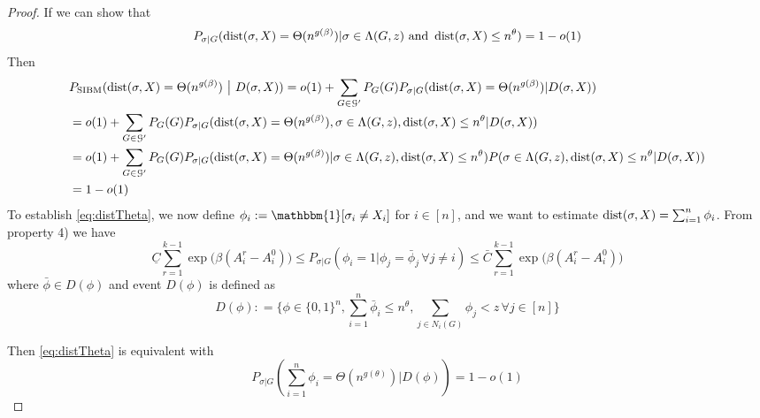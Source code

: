 \documentclass{article}
\begin{document}
\begin{proof}
	If we can show that
	\begin{equation}\label{eq:distTheta}
	P_{\sigma | G}(\operatorname{dist}(\sigma, X) = \Theta(n^{g(\beta)})
	| \sigma \in  \Lambda(G, z)
	\text{~and~} \operatorname{dist}(\sigma, X) \le n^\theta) = 1 - o(1)
	\end{equation}
	Then
	\begin{align*}
	&P_{\operatorname{SIBM}}(\operatorname{dist}(\sigma, X) = \Theta(n^{g(\beta)}) ~\big|~ D(\sigma, X) )  = o(1)
	+ \sum_{G \in \mathcal{G}'} P_G(G) P_{\sigma | G}(\operatorname{dist}(\sigma, X) = \Theta(n^{g(\beta)}) | D(\sigma, X)) \\
	& =o(1)
	+ \sum_{G \in \mathcal{G}'} P_G(G) P_{\sigma | G}(\operatorname{dist}(\sigma, X) = \Theta(n^{g(\beta)}),\sigma \in  \Lambda(G, z),
	\operatorname{dist}(\sigma, X) \le n^\theta | D(\sigma, X)) \\
	& = o(1)
	+ \sum_{G \in \mathcal{G}'} P_G(G) P_{\sigma | G}(\operatorname{dist}(\sigma, X) = \Theta(n^{g(\beta)}) | \sigma \in  \Lambda(G, z),
	\operatorname{dist}(\sigma, X) \le n^\theta) P(\sigma \in  \Lambda(G, z),
	\operatorname{dist}(\sigma, X) \le n^\theta | D(\sigma, X)) \\
	&= 1 - o(1)
	\end{align*}
	To establish \eqref{eq:distTheta}, we now define 
	$\phi_i := \mathbbm{1}[\sigma_i \neq X_i]$ for $i\in[n]$, and
	we want to estimate $\operatorname{dist}(\sigma, X)=\sum_{i=1}^n \phi_i$.
	From property 4) we have
	\begin{equation}
	\underline{C}\sum_{r=1}^{k-1}\exp\Big(\beta(A^r_i-A^0_i) \Big)  \le 
	P_{\sigma|G}(\phi_i = 1 | \phi_j = \bar{\phi}_j \,\forall j \neq i )
	\le \bar{C} \sum_{r=1}^{k-1}\exp\Big(\beta (A^r_i-A^0_i ) \Big) 
	\end{equation}
	where $ \bar{\phi} \in D(\phi)$ and event $D(\phi)$ is defined as
	$$
	D(\phi): = \{\phi \in \{0, 1\}^n, \sum_{i=1}^n \bar{\phi}_i \leq n^{\theta},
	\sum_{j\in N_i(G)}\phi_j < z \,\forall j \in [n] \}
	$$
	
	Then \eqref{eq:distTheta} is equivalent with 
	\begin{equation}\label{eq:phi_sum}
	P_{\sigma | G}(\sum_{i=1}^n \phi_i = \Theta(n^{g(\theta)}) | D(\phi) ) = 1-o(1)
	\end{equation}
	

\end{proof}
\end{document}

